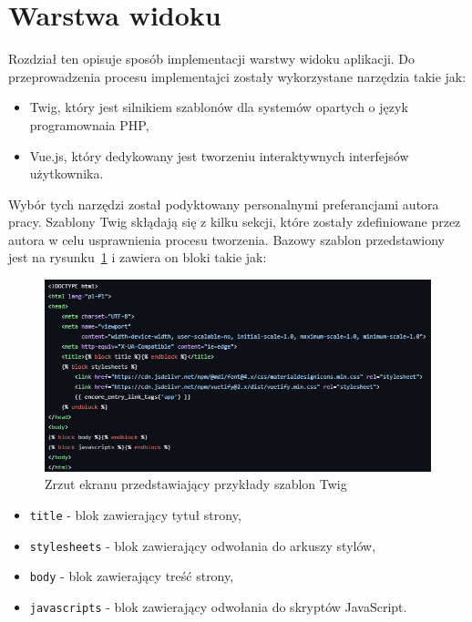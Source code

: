 \documentclass[12pt,oneside]{book}
\newcommand{\captionvspace}{\vspace{6pt}}
\begin{document}
    \section{Warstwa widoku}

    Rozdział ten opisuje sposób implementacji warstwy widoku aplikacji. Do przeprowadzenia procesu implementajci zostały wykorzystane narzędzia takie jak:

    \begin{itemize}
        \item Twig, który jest silnikiem szablonów dla systemów opartych o język programownaia PHP,
        \item Vue.js, który dedykowany jest tworzeniu interaktywnych interfejsów użytkownika.
    \end{itemize}


    Wybór tych narzędzi został podyktowany personalnymi preferancjami autora pracy. Szablony Twig skłądają się z kilku sekcji, które zostały zdefiniowane przez autora w celu usprawnienia procesu tworzenia. Bazowy szablon przedstawiony jest na rysunku~\ref{fig:twig-base-template} i zawiera on bloki takie jak:

    \begin{figure}[ht]
        \centering
        \includegraphics[width=\textwidth]{includes/images/twig-base-template.png}
        \captionvspace
        \caption{Zrzut ekranu przedstawiający przykłady szablon Twig}
        \label{fig:twig-base-template}
    \end{figure}

    \begin{itemize}
        \item \texttt{title} - blok zawierający tytuł strony,
        \item \texttt{stylesheets} - blok zawierający odwołania do arkuszy stylów,
        \item \texttt{body} - blok zawierający treść strony,
        \item \texttt{javascripts} - blok zawierający odwołania do skryptów JavaScript.
    \end{itemize}
\end{document}
